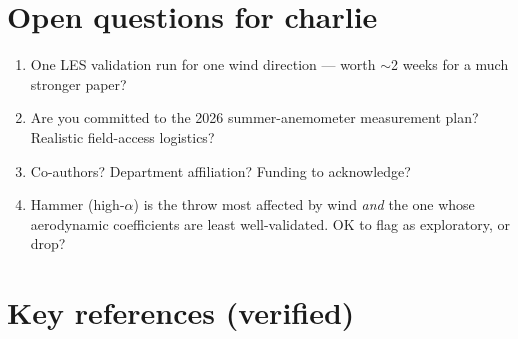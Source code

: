 \documentclass[11pt,letterpaper]{article}
\begin{document}
\section{Open questions for charlie}

\begin{enumerate}[leftmargin=*,itemsep=2pt]
  \item One LES validation run for one wind direction --- worth $\sim$2 weeks for a much stronger paper?
  \item Are you committed to the 2026 summer-anemometer measurement plan? Realistic field-access logistics?
  \item Co-authors? Department affiliation? Funding to acknowledge?
  \item Hammer (high-$\alpha$) is the throw most affected by wind \emph{and} the one whose aerodynamic coefficients are least well-validated. OK to flag as exploratory, or drop?
\end{enumerate}

\section*{Key references (verified)}
\end{document}
